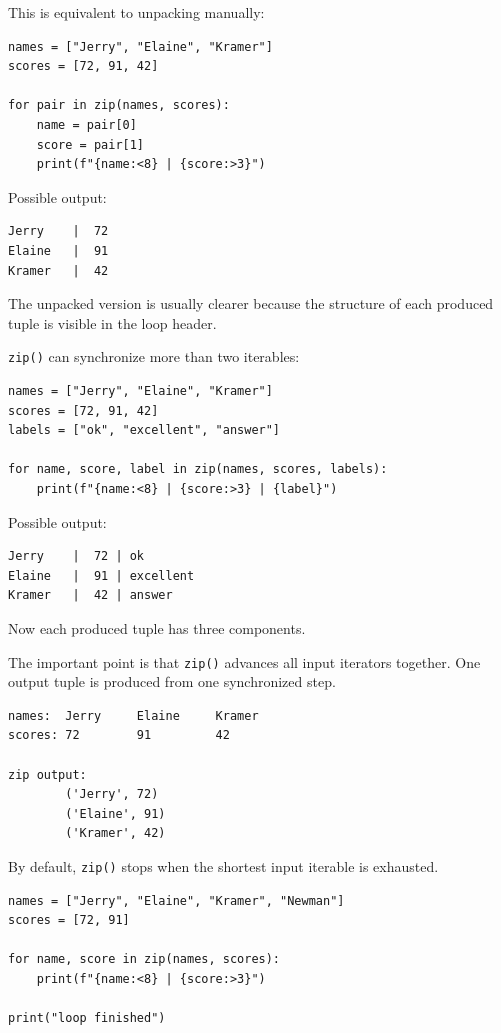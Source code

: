 This is equivalent to unpacking manually:

\begin{verbatim}
names = ["Jerry", "Elaine", "Kramer"]
scores = [72, 91, 42]

for pair in zip(names, scores):
    name = pair[0]
    score = pair[1]
    print(f"{name:<8} | {score:>3}")
\end{verbatim}

Possible output:

\begin{verbatim}
Jerry    |  72
Elaine   |  91
Kramer   |  42
\end{verbatim}

The unpacked version is usually clearer because the structure of each produced tuple is visible in the loop header.

\texttt{zip()} can synchronize more than two iterables:

\begin{verbatim}
names = ["Jerry", "Elaine", "Kramer"]
scores = [72, 91, 42]
labels = ["ok", "excellent", "answer"]

for name, score, label in zip(names, scores, labels):
    print(f"{name:<8} | {score:>3} | {label}")
\end{verbatim}

Possible output:

\begin{verbatim}
Jerry    |  72 | ok
Elaine   |  91 | excellent
Kramer   |  42 | answer
\end{verbatim}

Now each produced tuple has three components.

The important point is that \texttt{zip()} advances all input iterators together. One output tuple is produced from one synchronized step.

\begin{verbatim}
names:  Jerry     Elaine     Kramer
scores: 72        91         42

zip output:
        ('Jerry', 72)
        ('Elaine', 91)
        ('Kramer', 42)
\end{verbatim}

By default, \texttt{zip()} stops when the shortest input iterable is exhausted.

\begin{verbatim}
names = ["Jerry", "Elaine", "Kramer", "Newman"]
scores = [72, 91]

for name, score in zip(names, scores):
    print(f"{name:<8} | {score:>3}")

print("loop finished")
\end{verbatim}

